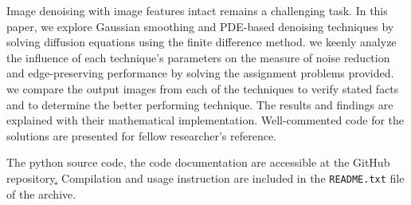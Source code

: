\documentclass{ipol}
\begin{document}



\begin{ipolAbstract}
Image denoising with image features intact remains a challenging task. In this paper, we explore Gaussian smoothing and PDE-based denoising techniques by solving diffusion equations using the finite difference method. we keenly analyze the influence of each technique's parameters on the measure of noise reduction and edge-preserving performance by solving the assignment problems provided. we compare the output images from each of the techniques to verify stated facts and to determine the better performing technique. The results and findings are explained with their mathematical implementation. Well-commented code for the solutions are presented for fellow researcher's reference.
\end{ipolAbstract}


\begin{ipolCode}
The python source code, the code documentation are accessible at the GitHub repository\href{https://github.com/BinuChristopher/ImageDenoising}. Compilation and usage instruction are included in the
\verb|README.txt| file of the archive.
\end{ipolCode}


\end{document}
